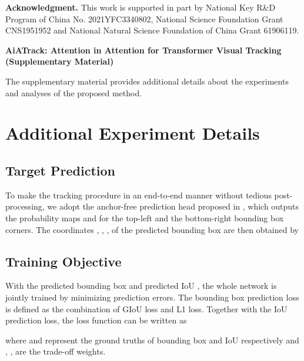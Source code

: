 \documentclass[runningheads]{llncs}
\begin{document}
\noindent\textbf{Acknowledgment.} This work is supported in part by National Key R\&D Program of China No. 2021YFC3340802, National Science Foundation Grant CNS1951952 and National Natural Science Foundation of China Grant 61906119.




\clearpage

\begin{center}
\textbf{\large AiATrack: Attention in Attention for Transformer Visual Tracking (Supplementary Material)}
\end{center}

The supplementary material provides additional details about the experiments and analyses of the proposed method.

\section{Additional Experiment Details}

\subsection{Target Prediction}
To make the tracking procedure in an end-to-end manner without tedious post-processing, we adopt the anchor-free prediction head proposed in \cite{yan2021learning}, which outputs the probability maps  and  for the top-left and the bottom-right bounding box corners. The coordinates , , ,  of the predicted bounding box are then obtained by 



\subsection{Training Objective}
With the predicted bounding box  and predicted IoU , the whole network is jointly trained by minimizing prediction errors. The bounding box prediction loss is defined as the combination of GIoU loss \cite{rezatofighi2019generalized} and L1 loss. Together with the IoU prediction loss, the loss function can be written as 

where  and  represent the ground truths of bounding box and IoU respectively and , ,  are the trade-off weights.
\end{document}
